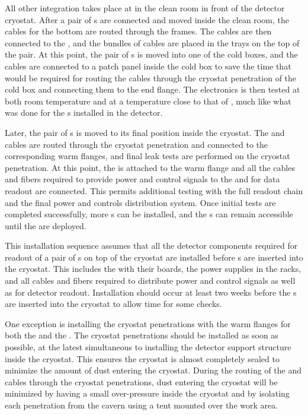 All other integration takes place at  in the clean room
in front of the detector cryostat. After a pair of s are 
connected and moved inside the clean room, the  cables
for the bottom  are routed through the  frames.
The cables are then connected to the , and the bundles
of cables are placed in the trays on the top of the  pair.
At this point, the pair of s is moved into one of the cold
boxes, and the cables are connected to a patch panel inside the cold box
to save the time that would be required for routing the cables through the cryostat
penetration of the cold box and connecting them to the end flange.
The  electronics is then tested at both room temperature
and at a temperature close to that of \lntwo, much like
what was done for the s installed in the  detector.

Later, the pair of s is moved to its final position 
inside the cryostat. The 
and  cables are routed through the cryostat penetration and
connected to the corresponding warm flanges, and final leak tests are performed
on the cryostat penetration. At this point, the  is attached
to the warm flange and all the cables and fibers required to provide 
power and control signals to the  and for data
readout are connected. This permits additional testing with the full 
 readout chain and the final power and controls distribution
system. Once initial tests are completed successfully, more s
can be installed, and the s can remain accessible until the  are
deployed.

This installation sequence assumes that all the  detector 
components required for readout of a pair of s  on top of the cryostat 
are installed before s are inserted into the cryostat. This 
includes the  with their boards, the power supplies in 
the racks, and all cables and fibers required to distribute power and
control signals as well as for detector readout. Installation should occur at least two weeks before
the s are inserted into the cryostat to allow time for some checks. 

One exception
is installing the cryostat penetrations with the warm flanges
for both the  and the . The cryostat
penetrations should be installed as soon as possible, at the latest
simultaneous to installing the detector support structure
inside the cryostat. This ensures the cryostat is almost 
completely sealed to minimize the amount of dust 
entering the cryostat. During the routing of the  and
 cables through the cryostat penetrations, dust entering the cryostat will be minimized by having a small
over-pressure inside the cryostat and by isolating each penetration
from the cavern using a tent mounted over 
the work area.

